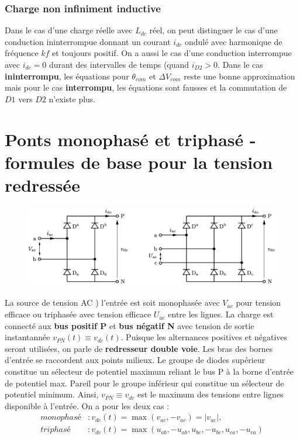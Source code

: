 		\subsubsection{Charge non infiniment inductive}
			Dans le cas d'une charge réelle avec $L_{dc}$ réel, on peut distinguer le cas d'une conduction ininterrompue donnant un courant $i_{dc}$ ondulé avec harmonique de fréquence $kf$ et toujours positif. On a aussi le cas d'une conduction interrompue avec $i_{dc} = 0$ durant des intervalles de temps (quand $i_{D2} >0$. Dans le cas \textbf{ininterrompu}, les équations pour $\theta _{com}$ et $\Delta V_{com}$ reste une bonne approximation mais pour le cas \textbf{interrompu}, les équations sont fausses et la commutation de $D1$ vers $D2$ n'existe plus. 
			
\section{Ponts monophasé et triphasé - formules de base pour la tension redressée}
	\begin{figure}
	\vspace{-5mm}
	\includegraphics[scale=0.3]{ch2/8}
	\end{figure} 			
	La source de tension AC ) l'entrée est soit monophasée avec $V_{ac}$ pour tension efficace ou triphasée avec tension efficace $U_{ac}$ entre les lignes. La charge est connecté aux \textbf{bus positif P}  et \textbf{bus négatif N} avec tension de sortie instantannée $v_{PN}(t) \equiv v_{dc}(t)$. Puisque les alternances positives et négatives seront utilisées, on parle de \textbf{redresseur double voie}. Les bras des bornes d'entrée se raccordent aux points milieux. Le groupe de diodes supérieur constitue un sélecteur de potentiel maximum reliant le bus P à la borne d'entrée de potentiel max. Pareil pour le groupe inférieur qui constitue un sélecteur de potentiel minimum. Ainsi, $v_{PN} \equiv v_{dc}$ est le maximum des tensions entre lignes disponible à l'entrée. On a pour les deux cas : 
	\begin{equation}
	\begin{aligned}
		monophasé &: v_{dc}(t) = \max (v_{ac}, -v_{ac}) = |v_{ac}|,\\
		triphasé &: v_{dc}(t) = \max (u_{ab}, -u_{ab}, u_{bc}, -u_{bc}, u_{ca}, -u_{ca})
	\end{aligned}
	\end{equation}
	

